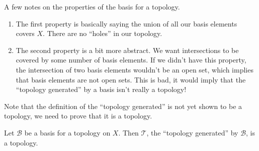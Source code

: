 \begin{rmk}\label{rmk:propertiesOfBasis}
A few notes on the properties of the basis for a topology.
\begin{enumerate}
\item The first property is basically saying the union of all our
  basis elements covers $X$. There are no ``holes'' in our
  topology.
\item The second property is a bit more abstract. We want
  intersections to be covered by some number of basis
  elements. If we didn't have this property, the intersection of
  two basis elements wouldn't be an open set, which implies that
  basis elements are not open sets. This is bad, it would imply
  that the ``topology generated'' by a basis isn't really a
  topology!
\end{enumerate}
\end{rmk}
\begin{prob}
Note that the definition of the ``topology generated'' is
  not yet shown to be a topology, we need to prove that it is a
  topology.
\end{prob}
\begin{thm}\label{thm:topologyGeneratedIsTopology}
  Let $\mathscr{B}$ be a basis for a topology on $X$. Then
  $\mathcal{T}$, the ``topology generated'' by $\mathscr{B}$, is
  a topology.
\end{thm}
